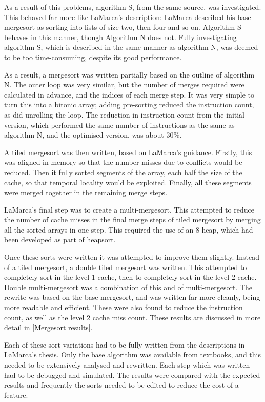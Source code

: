 As a result of this problems, algorithm S, from the same source, was
investigated. This behaved far more like LaMarca's description: LaMarca
described his base mergesort as sorting into lists of size two, then four and
so on. Algorithm S behaves in this manner, though Algorithm N does not. Fully
investigating algorithm S, which is described in the same manner as algorithm N,
was deemed to be too time-consuming, despite its good performance.

As a result, a mergesort was written partially based on the outline of algorithm
N. The outer loop was very similar, but the number of merges required were
calculated in advance, and the indices of each merge step.  It was very simple
to turn this into a bitonic array; adding pre-sorting reduced the instruction
count, as did unrolling the loop. The reduction in instruction count from the
initial version, which performed the same number of instructions as the same as
algorithm N, and the optimised version, was about 30\%.

A tiled mergesort was then written, based on LaMarca's guidance. Firstly, this
was aligned in memory so that the number misses due to conflicts would be
reduced.  Then it fully sorted segments of the array, each half the size of the
cache, so that temporal locality would be exploited. Finally, all these segments
were merged together in the remaining merge steps.

LaMarca's final step was to create a multi-mergesort. This attempted to reduce
the number of cache misses in the final merge steps of tiled mergesort by
merging all the sorted arrays in one step. This required the use of an 8-heap,
which had been developed as part of heapsort.

Once these sorts were written it was attempted to improve them slightly.
Instead of a tiled mergesort, a double tiled mergesort was written.  This
attempted to completely sort in the level 1 cache, then to completely sort in
the level 2 cache. Double multi-mergesort was a combination of this and of
multi-mergesort. The rewrite was based on the base mergesort, and was written
far more cleanly, being more readable and efficient. These were also found to
reduce the instruction count, as well as the level 2 cache miss count. These
results are discussed in more detail in \ref{Mergesort results}.

Each of these sort variations had to be fully written from the descriptions in
LaMarca's thesis. Only the base algorithm was available from textbooks, and this
needed to be extensively analysed and rewritten. Each step which was written had
to be debugged and simulated. The results were compared with the expected
results and frequently the sorts needed to be edited to reduce the cost of a
feature.

